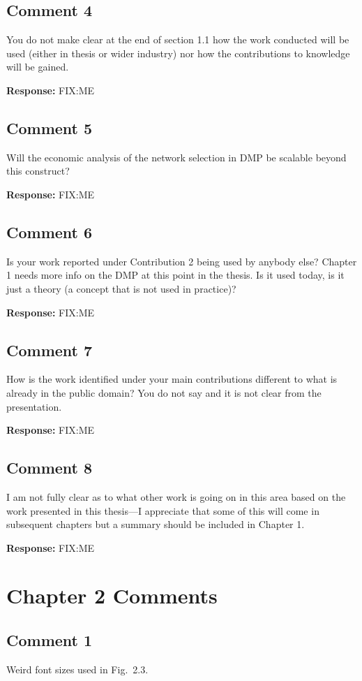 \documentclass[10pt,a4paper,notitlepage]{article}
\numberwithin{equation}{section}
\begin{document}
\subsection{Comment 4}
You do not make clear at the end of section 1.1 how the work conducted will be used (either in thesis or wider industry) nor how the contributions to knowledge will be gained.

\textbf{Response:}
FIX:ME

\subsection{Comment 5}
Will the economic analysis of the network selection in DMP be scalable beyond this construct?

\textbf{Response:}
FIX:ME

\subsection{Comment 6}
Is your work reported under Contribution 2 being used by anybody else? Chapter 1 needs more info on the DMP at this point in the thesis. Is it used today, is it just a theory (a concept that is not used in practice)?

\textbf{Response:}
FIX:ME

\subsection{Comment 7}
How is the work identified under your main contributions different to what is already in the public domain? You do not say and it is not clear from the presentation.

\textbf{Response:}
FIX:ME

\subsection{Comment 8}
I am not fully clear as to what other work is going on in this area based on the work presented in this thesis---I appreciate that some of this will come in subsequent chapters but a summary should be included in Chapter 1.

\textbf{Response:}
FIX:ME

\clearpage

\section{Chapter 2 Comments}
\subsection{Comment 1}
Weird font sizes used in Fig.~2.3.\\[-2ex]
\end{document}
